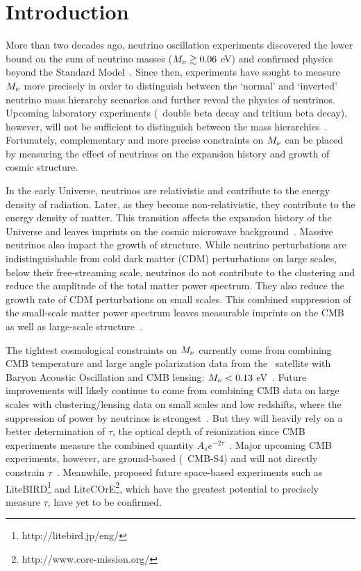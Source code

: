 \section{Introduction} \label{sec:intro}
More than two decades ago, neutrino oscillation experiments discovered the lower
bound on the sum of neutrino masses ($M_\nu \gtrsim 0.06$ eV) and confirmed
physics beyond the Standard Model~\citep{fukuda1998, forero2014, gonzalez-garcia2016}. 
Since then, experiments have sought to measure $M_\nu$ more precisely in order
to distinguish between the `normal' and `inverted' neutrino mass hierarchy
scenarios and further reveal the physics of neutrinos. Upcoming laboratory 
experiments (\eg~double beta decay and tritium beta decay), however, will not
be sufficient to distinguish between the mass hierarchies~\citep{bonn2011, drexlin2013}.
Fortunately, complementary and more precise constraints on $M_\nu$ can be
placed by measuring the effect of neutrinos on the expansion history and growth
of cosmic structure. 

In the early Universe, neutrinos are relativistic and contribute to the 
energy density of radiation. Later, as they become non-relativistic, 
they contribute to the energy density of matter. This transition affects 
the expansion history of the Universe and leaves imprints on the cosmic
microwave background~\citep[CMB;][]{lesgourgues2012, lesgourgues2014}. 
Massive neutrinos also impact the growth of structure. 
While neutrino perturbations are indistinguishable from cold dark matter (CDM)
perturbations on large scales, below their free-streaming scale, neutrinos 
do not contribute to the clustering and reduce the 
amplitude of the total matter power spectrum. They also reduce the growth 
rate of CDM perturbations on small scales. This combined suppression of 
the small-scale matter power spectrum leaves measurable imprints 
on the CMB as well as large-scale structure~\citep[for further details see][]{lesgourgues2012, lesgourgues2014, gerbino2018}. 

The tightest cosmological constraints on $M_\nu$ currently come from 
combining CMB temperature and large angle polarization data from the 
\planck~satellite with Baryon Acoustic Oscillation and CMB lensing: 
$M_\nu < 0.13$ eV~\citep{planckcollaboration2018}. Future improvements
will likely continue to come from combining CMB data on large scales 
with clustering/lensing data on small scales and low redshifts, where 
the suppression of power by neutrinos is strongest~\citep{brinckmann2019}. 
But they will heavily rely on a better determination of $\tau$, the optical
depth of reionization since CMB experiments measure the combined quantity $A_s
e^{-2\tau}$~\citep{allison2015, liu2016, archidiacono2017}.
Major upcoming CMB experiments, however, are ground-based (\eg~CMB-S4) and 
will not directly constrain $\tau$~\citep{abazajian2016}. Meanwhile, proposed
future space-based experiments such as
LiteBIRD\footnote{http://litebird.jp/eng/} and 
LiteCOrE\footnote{http://www.core-mission.org/}, which have the greatest 
potential to precisely measure $\tau$, have yet to be confirmed. 

